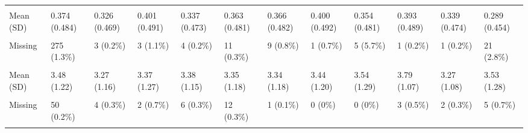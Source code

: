 \documentclass[
  single column]{article}
\begin{document}
\begin{landscape}
\begin{longtable}[t]{llllllllllll}
\addlinespace
\cellcolor{gray!10}{male\_binary} & \cellcolor{gray!10}{} & \cellcolor{gray!10}{} & \cellcolor{gray!10}{} & \cellcolor{gray!10}{} & \cellcolor{gray!10}{} & \cellcolor{gray!10}{} & \cellcolor{gray!10}{} & \cellcolor{gray!10}{} & \cellcolor{gray!10}{} & \cellcolor{gray!10}{} & \cellcolor{gray!10}{}\\
Mean (SD) & 0.374 (0.484) & 0.326 (0.469) & 0.401 (0.491) & 0.337 (0.473) & 0.363 (0.481) & 0.366 (0.482) & 0.400 (0.492) & 0.354 (0.481) & 0.393 (0.489) & 0.339 (0.474) & 0.289 (0.454)\\
\cellcolor{gray!10}{Median [Min, Max]} & \cellcolor{gray!10}{0 [0, 1.00]} & \cellcolor{gray!10}{0 [0, 1.00]} & \cellcolor{gray!10}{0 [0, 1.00]} & \cellcolor{gray!10}{0 [0, 1.00]} & \cellcolor{gray!10}{0 [0, 1.00]} & \cellcolor{gray!10}{0 [0, 1.00]} & \cellcolor{gray!10}{0 [0, 1.00]} & \cellcolor{gray!10}{0 [0, 1.00]} & \cellcolor{gray!10}{0 [0, 1.00]} & \cellcolor{gray!10}{0 [0, 1.00]} & \cellcolor{gray!10}{0 [0, \vphantom{2} 1.00]}\\
Missing & 275 (1.3\%) & 3 (0.2\%) & 3 (1.1\%) & 4 (0.2\%) & 11 (0.3\%) & 9 (0.8\%) & 1 (0.7\%) & 5 (5.7\%) & 1 (0.2\%) & 1 (0.2\%) & 21 (2.8\%)\\
\cellcolor{gray!10}{neuroticism} & \cellcolor{gray!10}{} & \cellcolor{gray!10}{} & \cellcolor{gray!10}{} & \cellcolor{gray!10}{} & \cellcolor{gray!10}{} & \cellcolor{gray!10}{} & \cellcolor{gray!10}{} & \cellcolor{gray!10}{} & \cellcolor{gray!10}{} & \cellcolor{gray!10}{} & \cellcolor{gray!10}{}\\
\addlinespace
Mean (SD) & 3.48 (1.22) & 3.27 (1.16) & 3.37 (1.27) & 3.38 (1.15) & 3.35 (1.18) & 3.34 (1.18) & 3.44 (1.20) & 3.54 (1.29) & 3.79 (1.07) & 3.27 (1.08) & 3.53 (1.28)\\
\cellcolor{gray!10}{Median [Min, Max]} & \cellcolor{gray!10}{3.50 [1.00, 7.00]} & \cellcolor{gray!10}{3.25 [1.00, 7.00]} & \cellcolor{gray!10}{3.25 [1.00, 7.00]} & \cellcolor{gray!10}{3.25 [1.00, 7.00]} & \cellcolor{gray!10}{3.25 [1.00, 7.00]} & \cellcolor{gray!10}{3.25 [1.00, 7.00]} & \cellcolor{gray!10}{3.29 [1.00, 7.00]} & \cellcolor{gray!10}{3.50 [1.00, 6.50]} & \cellcolor{gray!10}{3.75 [1.00, 7.00]} & \cellcolor{gray!10}{3.25 [1.00, 7.00]} & \cellcolor{gray!10}{3.50 [1.00, 7.00]}\\
Missing & 50 (0.2\%) & 4 (0.3\%) & 2 (0.7\%) & 6 (0.3\%) & 12 (0.3\%) & 1 (0.1\%) & 0 (0\%) & 0 (0\%) & 3 (0.5\%) & 2 (0.3\%) & 5 (0.7\%)\\
\cellcolor{gray!10}{not\_heterosexual\_binary} & \cellcolor{gray!10}{} & \cellcolor{gray!10}{} & \cellcolor{gray!10}{} & \cellcolor{gray!10}{} & \cellcolor{gray!10}{} & \cellcolor{gray!10}{} & \cellcolor{gray!10}{} & \cellcolor{gray!10}{} & \cellcolor{gray!10}{} & \cellcolor{gray!10}{} & \cellcolor{gray!10}{}\\

\end{longtable}
\end{landscape}
\end{document}
